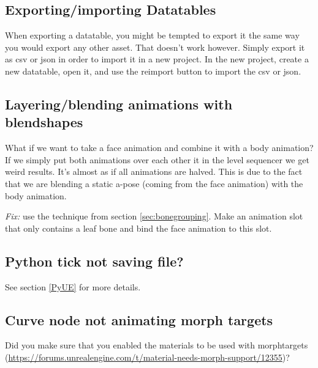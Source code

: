 \documentclass{uva-inf-article}
\begin{document}
\subsection{Exporting/importing Datatables}
When exporting a datatable, you might be tempted to export it the same way you would export any other asset. That doesn't work however. Simply export it as csv or json in order to import it in a new project. In the new project, create a new datatable, open it, and use the reimport button to import the csv or json.

\subsection{Layering/blending animations with blendshapes}
What if we want to take a face animation and combine it with a body animation? If we simply put both animations over each other it in the level sequencer we get weird results. It's almost as if all animations are halved. This is due to the fact that we are blending a static a-pose (coming from the face animation) with the body animation.

\textit{Fix:} use the technique from section \ref{sec:bonegrouping}. Make an animation slot that only contains a leaf bone and bind the face animation to this slot.

\subsection{Python tick not saving file?}
See section \ref{PyUE} for more details.

\subsection{Curve node not animating morph targets}
Did you make sure that you enabled the materials to be used with morphtargets (\url{https://forums.unrealengine.com/t/material-needs-morph-support/12355})?
\end{document}
